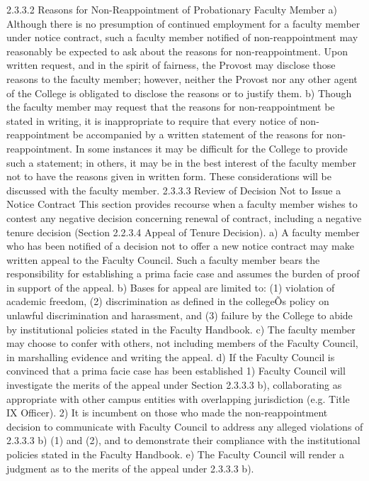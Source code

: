 \documentclass[letterpaper, 11pt]{article}
\begin{document}
2.3.3.2 Reasons for Non-Reappointment of Probationary Faculty Member
a) Although there is no presumption of continued employment for a faculty member under notice contract, such a faculty member notified of non-reappointment may reasonably be expected to ask about the reasons for non-reappointment.  Upon written request, and in the spirit of fairness, the Provost may disclose those reasons to the faculty member; however, neither the Provost nor any other agent of the College is obligated to disclose the reasons or to justify them.
b) Though the faculty member may request that the reasons for non-reappointment be stated in writing, it is inappropriate to require that every notice of non-reappointment be accompanied by a written statement of the reasons for non-reappointment.  In some instances it may be difficult for the College to provide such a statement; in others, it may be in the best interest of the faculty member not to have the reasons given in written form.  These considerations will be discussed with the faculty member.
2.3.3.3 Review of Decision Not to Issue a Notice Contract
   This section provides recourse when a faculty member wishes to contest any negative decision concerning renewal of contract, including a negative tenure decision (Section 2.2.3.4 Appeal of Tenure Decision).
a) A faculty member who has been notified of a decision not to offer a new notice contract may make written appeal to the Faculty Council.  Such a faculty member bears the responsibility for establishing a prima facie case and assumes the burden of proof in support of the appeal.
b) Bases for appeal are limited to: (1) violation of academic freedom, (2) discrimination as defined in the collegeÕs policy on unlawful discrimination and harassment, and (3) failure by the College to abide by institutional policies stated in the Faculty Handbook.
c) The faculty member may choose to confer with others, not including members of the Faculty Council, in marshalling evidence and writing the appeal.
d) If the Faculty Council is convinced that a prima facie case has been established
1) Faculty Council will investigate the merits of the appeal under Section 2.3.3.3 b), collaborating as appropriate with other campus entities with overlapping jurisdiction (e.g. Title IX Officer).
2) It is incumbent on those who made the non-reappointment decision to communicate with Faculty Council to address any alleged violations of 2.3.3.3 b) (1) and (2), and to demonstrate their compliance with the institutional policies stated in the Faculty Handbook.
e) The Faculty Council will render a judgment as to the merits of the appeal under 2.3.3.3 b).
\end{document}

